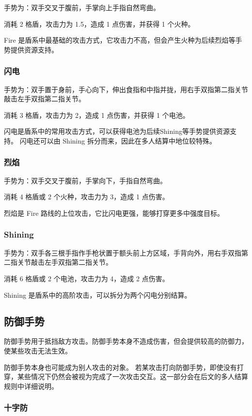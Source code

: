 \documentclass[12pt]{ctexart}
\begin{document}
手势为：双手交叉于腹前，手掌向上手指自然弯曲。

消耗 2 格盾，攻击力为 1.5，造成 1 点伤害，并获得 1 个火种。

Fire 是盾系中最基础的攻击方式，它攻击力不高，但会产生火种为后续烈焰等手势提供资源支持。

\subsubsection{闪电}

手势为：双手置于身前，手心向下，伸出食指和中指并拢，用右手双指第二指关节敲击左手双指第二指关节。

消耗 3 格盾，攻击力为 2，造成 1 点伤害，并获得 1 个电池。

闪电是盾系中的常用攻击方式，可以获得电池为后续Shining等手势提供资源支持。
闪电还可以由 Shining 拆分而来，因此在多人结算中地位较特殊。

\subsubsection{烈焰}

手势为：双手交叉于腹前，手掌向下，手指自然弯曲。

消耗 4 格盾或 2 个火种，攻击力为 3，造成 1 点伤害。

烈焰是 Fire 路线的上位攻击，它比闪电更强，能够打穿更多中强度目标。

\subsubsection{Shining}

手势为：双手各三根手指作手枪状置于额头前上方区域，手背向外，用右手双指第二指关节敲击左手双指第二指关节。

消耗 6 格盾或 2 个电池，攻击力为 4，造成 2 点伤害。

Shining 是盾系中的高阶攻击，可以拆分为两个闪电分别结算。

\subsection{防御手势}

防御手势用于抵挡敌方攻击。防御手势本身不造成伤害，但会提供较高的防御力，使某些攻击无法生效。

防御手势本身也可能成为别人攻击的对象。
若某攻击打向防御手势，即使没有打穿，某些情况下仍然会被视为完成了一次攻击交互。这一部分会在后文的多人结算规则中详细说明。

\subsubsection{十字防}
\end{document}
